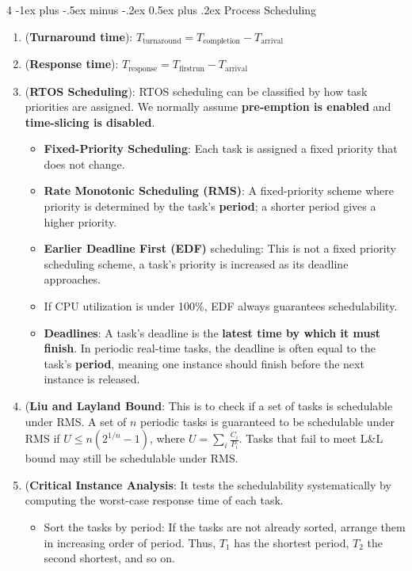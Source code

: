 \documentclass[10pt, landscape]{article}
\makeatletter
\renewcommand{\section}{\@startsection{section}{1}{0mm}%
                                {-1ex plus -.5ex minus -.2ex}%
                                {0.5ex plus .2ex}%
                                {\normalfont\large\bfseries}}
\makeatother
\begin{document}
\begin{multicols}{4}
\section{Process Scheduling}
\begin{enumerate}
    \item (\textbf{Turnaround time}): $T_{\text{turnaround}}=T_{\text{completion}}-T_{\text{arrival}}$
    \item (\textbf{Response time}): $T_{\text{response}}=T_{\text{firstrun}}-T_{\text{arrival}}$
    \item (\textbf{RTOS Scheduling}): RTOS scheduling can be classified by how task priorities are assigned. We normally assume \textbf{pre-emption is enabled} and \textbf{time-slicing is disabled}.
    \begin{itemize}
        \item \textbf{Fixed-Priority Scheduling}: Each task is assigned a fixed priority that does not change.
        \item \textbf{Rate Monotonic Scheduling (RMS)}: A fixed-priority scheme where priority is determined by the task's \textbf{period}; a shorter period gives a higher priority.
        \item \textbf{Earlier Deadline First (EDF)} scheduling: This is not a fixed priority scheduling scheme, a task's priority is increased as its deadline approaches.
        \item If CPU utilization is under 100\%, EDF always guarantees schedulability.
        \item \textbf{Deadlines}: A task's deadline is the \textbf{latest time by which it must finish}. In periodic real-time tasks, the deadline is often equal to the task's \textbf{period}, meaning one instance should finish before the next instance is released.
    \end{itemize}
    \item (\textbf{Liu and Layland Bound}: This is to check if a set of tasks is schedulable under RMS. A set of $n$ periodic tasks is guaranteed to be schedulable under RMS if $U \leq n\left(2^{1/n}-1\right)$, where $U=\sum_i\frac{C_i}{P_i}$. Tasks that fail to meet L\&L bound may still be schedulable under RMS.
    \item (\textbf{Critical Instance Analysis}: It tests the schedulability systematically by computing the worst-case response time of each task.
    \begin{itemize}
        \item Sort the tasks by period: If the tasks are not already sorted, arrange them in increasing order of period. Thus, $T_1$ has the shortest period, $T_2$ the second shortest, and so on.

\end{itemize}
\end{enumerate}
\end{multicols}
\end{document}
